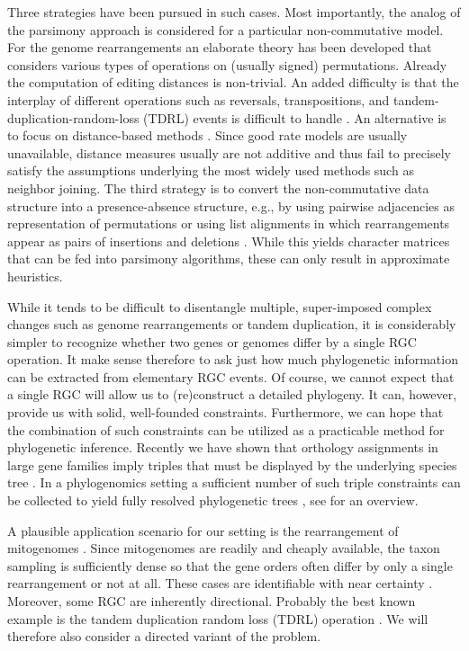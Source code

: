 \documentclass[smallextended]{svjour3}
\let\cite\citep
\begin{document}
Three strategies have been pursued in such cases. Most importantly, the
analog of the parsimony approach is considered for a particular
non-commutative model. For the genome rearrangements an elaborate theory has
been developed that considers various types of operations on (usually
signed) permutations. Already the computation of editing distances is
non-trivial. An added difficulty is that the interplay of different
operations such as reversals, transpositions, and
tandem-duplication-random-loss (TDRL) events is difficult to handle
\cite{Bernt:07a,Hartmann:16}. An alternative is to focus on distance-based
methods \cite{Wang:06}. Since good rate models are usually unavailable,
distance measures usually are not additive and thus fail to precisely
satisfy the assumptions underlying the most widely used methods such as
neighbor joining. The third strategy is to convert the non-commutative data
structure into a presence-absence structure, e.g., by using pairwise
adjacencies \cite{Tang:05} as representation of permutations or using list
alignments in which rearrangements appear as pairs of insertions and
deletions \cite{Fritzsch:06a}. While this yields character matrices that
can be fed into parsimony algorithms, these can only result in approximate
heuristics.

While it tends to be difficult to disentangle multiple, super-imposed
complex changes such as genome rearrangements or tandem duplication, it is
considerably simpler to recognize whether two genes or genomes differ by a
single RGC operation. It make sense therefore to ask just how much
phylogenetic information can be extracted from elementary RGC events. Of
course, we cannot expect that a single RGC will allow us to (re)construct a
detailed phylogeny. It can, however, provide us with solid, well-founded
constraints. Furthermore, we can hope that the combination of such
constraints can be utilized as a practicable method for phylogenetic
inference. Recently we have shown that orthology assignments in large gene
families imply triples that must be displayed by the underlying species
tree \cite{HernandezRosales:12a,Hellmuth:13a}. In a phylogenomics setting a
sufficient number of such triple constraints can be collected to yield
fully resolved phylogenetic trees \cite{Hellmuth:15a}, see \citet{HW:16b}
for an overview.

A plausible application scenario for our setting is the rearrangement of
mitogenomes \cite{Sankoff:82}. Since mitogenomes are readily and cheaply
available, the taxon sampling is sufficiently dense so that the gene orders
often differ by only a single rearrangement or not at all. These cases are
identifiable with near certainty \cite{Bernt:07a}. Moreover, some RGC are
inherently directional. Probably the best known example is the tandem
duplication random loss (TDRL) operation \cite{Chaudhuri:06}. We will
therefore also consider a directed variant of the problem.
\end{document}
